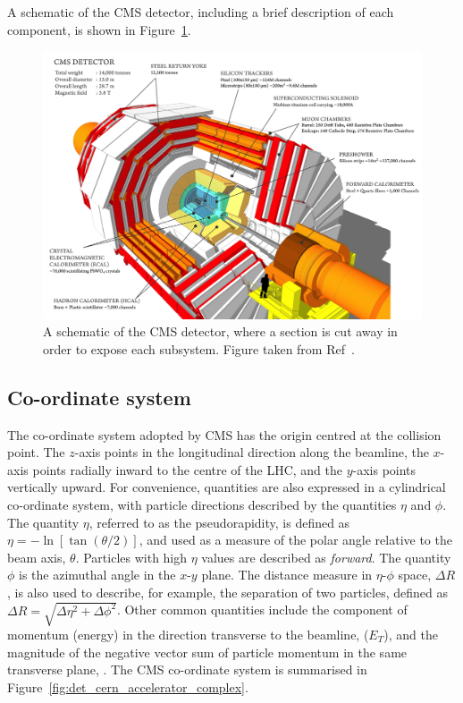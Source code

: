 \noindent A schematic of the CMS detector, including a brief description of each component, is shown in Figure~\ref{fig:cms_detector}.

\begin{figure}[htbp!]
\centering
\includegraphics[width =0.92\linewidth]{Figures/Detector/CMS/CMS_cut_away.png}
\caption[The CMS detector.]{A schematic of the CMS detector, where a section is cut away in order to expose each subsystem. Figure taken from Ref~\cite{SketchUp}.}
\label{fig:cms_detector}
\end{figure}

\subsection{Co-ordinate system}

The co-ordinate system adopted by CMS has the origin centred at the collision point. The $z$-axis points in the longitudinal direction along the beamline, the $x$-axis points radially inward to the centre of the LHC, and the $y$-axis points vertically upward. For convenience, quantities are also expressed in a cylindrical co-ordinate system, with particle directions described by the quantities $\eta$ and $\phi$. The quantity $\eta$, referred to as the pseudorapidity, is defined as $\eta=-\ln\left[\tan\left(\theta/2\right)\right]$, and used as a measure of the polar angle relative to the beam axis, $\theta$. Particles with high $\eta$ values are described as \textit{forward}. The quantity $\phi$ is the azimuthal angle in the $x$-$y$ plane. The distance measure in $\eta$-$\phi$ space, $\Delta R$, is also used to describe, for example, the separation of two particles, defined as $\Delta R= \sqrt{ \Delta \eta^{2} + \Delta \phi^{2}}$. Other common quantities include the component of momentum (energy) in the direction transverse to the beamline, \pt ($E_{T}$), and the magnitude of the negative vector sum of particle momentum in the same transverse plane, \met. The CMS co-ordinate system is summarised in Figure~\ref{fig:det_cern_accelerator_complex}.

